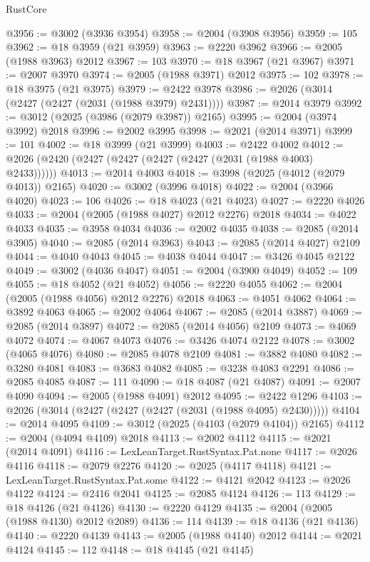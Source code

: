 \begin{lexlean}{RustCore}
\begin{coremodule}
@3956 := @3002 (@3936 @3954)
@3958 := @2004 (@3908 @3956)
@3959 := 105
@3962 := @18 @3959 (@21 @3959)
@3963 := @2220 @3962
@3966 := @2005 (@1988 @3963) @2012
@3967 := 103
@3970 := @18 @3967 (@21 @3967)
@3971 := @2007 @3970
@3974 := @2005 (@1988 @3971) @2012
@3975 := 102
@3978 := @18 @3975 (@21 @3975)
@3979 := @2422 @3978
@3986 := @2026 (@3014 (@2427 (@2427 (@2031 (@1988 @3979) @2431))))
@3987 := @2014 @3979
@3992 := @3012 (@2025 (@3986 (@2079 @3987)) @2165)
@3995 := @2004 (@3974 @3992) @2018
@3996 := @2002 @3995
@3998 := @2021 (@2014 @3971)
@3999 := 101
@4002 := @18 @3999 (@21 @3999)
@4003 := @2422 @4002
@4012 := @2026 (@2420 (@2427 (@2427 (@2427 (@2427 (@2031 (@1988 @4003) @2433))))))
@4013 := @2014 @4003
@4018 := @3998 (@2025 (@4012 (@2079 @4013)) @2165)
@4020 := @3002 (@3996 @4018)
@4022 := @2004 (@3966 @4020)
@4023 := 106
@4026 := @18 @4023 (@21 @4023)
@4027 := @2220 @4026
@4033 := @2004 (@2005 (@1988 @4027) @2012 @2276) @2018
@4034 := @4022 @4033
@4035 := @3958 @4034
@4036 := @2002 @4035
@4038 := @2085 (@2014 @3905)
@4040 := @2085 (@2014 @3963)
@4043 := @2085 (@2014 @4027) @2109
@4044 := @4040 @4043
@4045 := @4038 @4044
@4047 := @3426 @4045 @2122
@4049 := @3002 (@4036 @4047)
@4051 := @2004 (@3900 @4049)
@4052 := 109
@4055 := @18 @4052 (@21 @4052)
@4056 := @2220 @4055
@4062 := @2004 (@2005 (@1988 @4056) @2012 @2276) @2018
@4063 := @4051 @4062
@4064 := @3892 @4063
@4065 := @2002 @4064
@4067 := @2085 (@2014 @3887)
@4069 := @2085 (@2014 @3897)
@4072 := @2085 (@2014 @4056) @2109
@4073 := @4069 @4072
@4074 := @4067 @4073
@4076 := @3426 @4074 @2122
@4078 := @3002 (@4065 @4076)
@4080 := @2085 @4078 @2109
@4081 := @3882 @4080
@4082 := @3280 @4081
@4083 := @3683 @4082
@4085 := @3238 @4083 @2291
@4086 := @2085 @4085
@4087 := 111
@4090 := @18 @4087 (@21 @4087)
@4091 := @2007 @4090
@4094 := @2005 (@1988 @4091) @2012
@4095 := @2422 @1296
@4103 := @2026 (@3014 (@2427 (@2427 (@2427 (@2031 (@1988 @4095) @2430)))))
@4104 := @2014 @4095
@4109 := @3012 (@2025 (@4103 (@2079 @4104)) @2165)
@4112 := @2004 (@4094 @4109) @2018
@4113 := @2002 @4112
@4115 := @2021 (@2014 @4091)
@4116 := LexLeanTarget.RustSyntax.Pat.none
@4117 := @2026 @4116
@4118 := @2079 @2276
@4120 := @2025 (@4117 @4118)
@4121 := LexLeanTarget.RustSyntax.Pat.some
@4122 := @4121 @2042
@4123 := @2026 @4122
@4124 := @2416 @2041
@4125 := @2085 @4124
@4126 := 113
@4129 := @18 @4126 (@21 @4126)
@4130 := @2220 @4129
@4135 := @2004 (@2005 (@1988 @4130) @2012 @2089)
@4136 := 114
@4139 := @18 @4136 (@21 @4136)
@4140 := @2220 @4139
@4143 := @2005 (@1988 @4140) @2012
@4144 := @2021 @4124
@4145 := 112
@4148 := @18 @4145 (@21 @4145)

\end{coremodule}
\end{lexlean}
